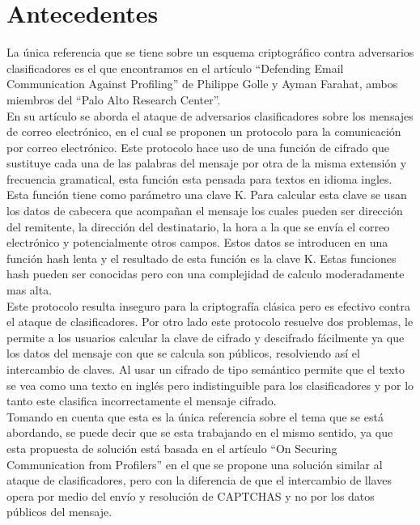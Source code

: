 \documentclass[12pt,oneside,onecolumn,openany]{report}
\begin{document}
\chapter{Antecedentes} %
La  única  referencia  que se tiene  sobre  un  esquema  criptográfico  contra  adversarios clasificadores es el que encontramos en el artículo 
“Defending Email Communication Against Profiling” de Philippe Golle  y  Ayman  Farahat, ambos  miembros del 
“Palo Alto Research Center”.\\
En su artículo se aborda el ataque de adversarios clasificadores sobre los mensajes de correo electrónico, en el cual se proponen un protocolo para la comunicación por correo electrónico. Este protocolo hace uso de una función  de cifrado que sustituye cada una de las palabras del mensaje por otra de la misma extensión y frecuencia gramatical, esta función esta pensada para textos en idioma ingles. 
Esta función tiene como parámetro una clave K.  Para calcular esta clave se usan los datos de cabecera que acompañan el mensaje los cuales pueden ser dirección  del remitente, la dirección del destinatario, la hora a la que se envía el correo electrónico y potencialmente otros campos. Estos datos se introducen en una función hash lenta y el resultado de esta función es la clave K. Estas funciones hash  pueden ser conocidas pero con una complejidad de calculo moderadamente mas alta.  \\
Este  protocolo resulta inseguro para la criptografía clásica pero es efectivo contra el ataque de clasificadores. Por otro lado este protocolo resuelve dos problemas, le  permite  a los usuarios  calcular  la  clave de cifrado y descifrado  fácilmente  ya  que  los datos del mensaje con que se calcula son  públicos, resolviendo así el intercambio de claves. Al usar un cifrado de tipo semántico permite que el texto se vea como una texto en inglés pero indistinguible para los clasificadores y por lo tanto este clasifica incorrectamente el mensaje cifrado.\\
Tomando  en  cuenta  que  esta  es  la  única  referencia  sobre el  tema  que  se está abordando, se puede decir que se esta trabajando en el mismo sentido, ya que esta propuesta de solución está  basada en el  artículo “On Securing  Communication  from Profilers”\cite{clas,Attacks} en el que  se  propone  una solución similar al ataque de clasificadores, pero con la diferencia de que el intercambio de llaves opera por medio del envío y resolución de CAPTCHAS y no por los datos públicos del mensaje. 
\end{document}

